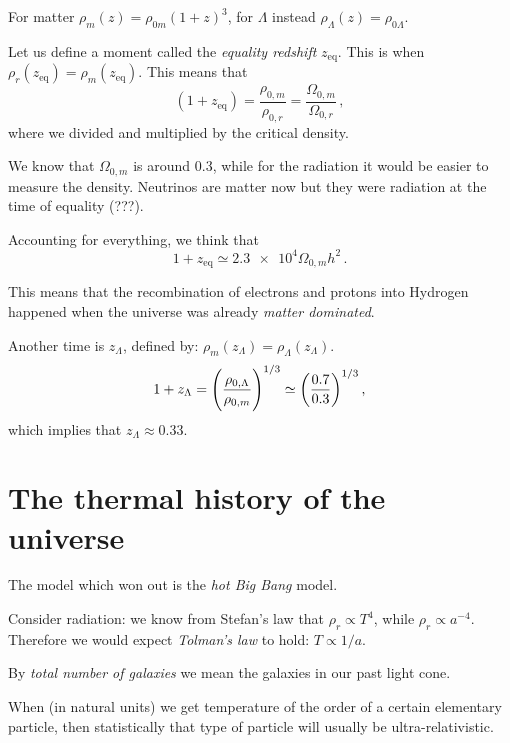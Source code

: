 \documentclass[main.tex]{subfiles}
\begin{document}
For matter \(\rho _m (z) = \rho_{0m} (1+z)^{3}\), for \(\Lambda \) instead \(\rho _\Lambda (z) = \rho _{0 \Lambda }\).

Let us define a moment called the \emph{equality redshift} \(z _{\text{eq}}\). This is when \(\rho _r (z _{\text{eq}}) = \rho _m (z _{\text{eq}})\). This means that 
%
\begin{equation}
  (1+z _{\text{eq}}) = \frac{\rho _{0,m}}{\rho _{0,r}} 
  = \frac{\Omega_{0,m}}{\Omega_{0,r}}
\,,
\end{equation}
%
where we divided and multiplied by the critical density.

We know that \(\Omega_{0,m}\) is around \num{0.3}, while for the radiation it would be easier to measure the density.
Neutrinos are matter now but they were radiation at the time of equality (???).

Accounting for everything, we think that 
%
\begin{equation}
  1 + z _{\text{eq}} \simeq \num{2.3e4} \Omega_{0, m} h^2
\,.
\end{equation}

This means that the recombination of electrons and protons into Hydrogen happened when the universe was already \emph{matter dominated}.

Another time is \(z_\Lambda \), defined by: \(\rho _m (z_{\Lambda }) = \rho _\Lambda (z_\Lambda )\). 
%
\begin{equation}
  1+ z_\Lambda = \qty(\frac{\rho_{0, \Lambda }}{\rho_{0,m}})^{1/3} \simeq \qty(\frac{0.7}{0.3})^{1/3}
\,,
\end{equation}
%
which implies that \(z_\Lambda \approx \num{0.33}\).

\chapter{The thermal history of the universe}

The model which won out is the \emph{hot Big Bang} model.

Consider radiation: we know from Stefan's law that \(\rho _r \propto T^{4}\), while \(\rho _r \propto a^{-4}\). Therefore we would expect \emph{Tolman's law} to hold: \(T \propto 1/a\).

By \emph{total number of galaxies} we mean the galaxies in our past light cone.

When (in natural units) we get temperature of the order of a certain elementary particle, then statistically that type of particle will usually be ultra-relativistic.
\end{document}
